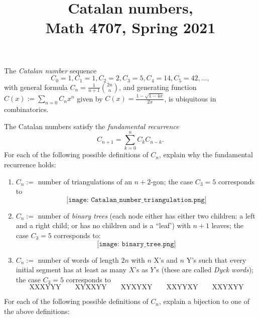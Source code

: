 \documentclass[11pt]{article}
\title{Catalan numbers, \\ Math 4707, Spring 2021}
\author{}
\date{}
\begin{document}
\maketitle

\vspace{-0.75cm}

The \emph{Catalan number} sequence 
\[C_0=1,C_1=1, C_2=2, C_3=5, C_4=14, C_5=42, \ldots,\] 
with general formula $C_n = \frac{1}{n+1}\binom{2n}{n}$, and generating function $C(x) := \sum_{n=0} C_n x^n$ given by $C(x) = \frac{1-\sqrt{1-4x}}{2x}$, is ubiquitous in combinatorics.

The Catalan numbers satisfy the \emph{fundamental recurrence} 
\[C_{n+1} = \sum_{k=0}^{n}C_k C_{n-k}.\]
 For each of the following possible definitions of $C_n$, explain why the fundamental recurrence holds:

\begin{enumerate}
\item $C_n := $ number of triangulations of an $n+2$-gon; the case $C_3=5$ corresponds to
\[\texttt{[image: Catalan\_number\_triangulation.png]}\]
\item $C_n := $ number of \emph{binary trees} (each node either has either two children: a left and a right child; or has no children and is a ``leaf') with $n+1$ leaves; the case $C_3=5$ corresponds to:
\[\texttt{[image: binary\_tree.png]}\]

\vspace{-0.2cm}
\item $C_n := $ number of words of length $2n$ with $n$ X's and $n$ Y's such that every initial segment has at least as many $X$'s as $Y$'s (these are called \emph{Dyck words}); the case $C_3=5$ corresponds to
\[\textrm{XXXYYY}  \qquad   \textrm{XYXXYY}  \qquad   \textrm{XYXYXY}  \qquad   \textrm{XXYYXY}  \qquad \textrm{XXYXYY}\]
\end{enumerate}

\pagebreak

For each of the following possible definitions of $C_n$, explain a bijection to one of the above definitions:
\end{document}
